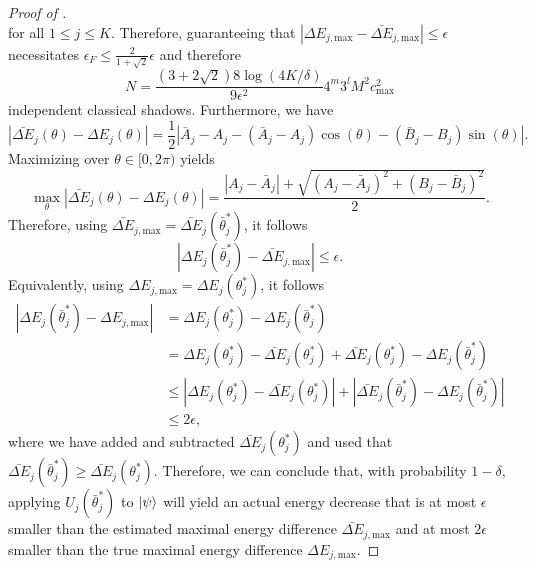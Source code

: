 \begin{proof}[Proof of ]
\begin{equation}
    \end{equation}
    for all $1\leq j \leq K$. Therefore, guaranteeing that  $|\Delta E_{j, \mathrm{max}}-\bar{\Delta E}_{j, \mathrm{max}}|\leq\epsilon$ necessitates $\epsilon_F\leq \frac{2}{1+\sqrt{2}}\epsilon$ and therefore
    \begin{equation}
        N=\frac{(3+2\sqrt{2})8\log(4K/\delta)}{9\epsilon^2}4^m3^lM^2c^2_\mathrm{max}
    \end{equation}
    independent classical shadows. 
    Furthermore, we have
    \begin{equation}
        \left|\bar{\Delta E}_j(\theta)-\Delta E_j(\theta)\right|=\frac{1}{2}\left|\bar{A}_j-A_j-\left(\bar{A}_j-A_j\right)\cos(\theta)-\left(\bar{B}_j-B_j \right)\sin(\theta)\right|.
    \end{equation}
    Maximizing over $\theta\in[0,2\pi)$ yields
    \begin{equation}
        \max_{\theta}\left|\bar{\Delta E}_j(\theta)-\Delta E_j(\theta)\right|= \frac{\left|A_j-\bar{A}_j\right|+\sqrt{\left(A_j-\bar{A}_j\right)^2+\left(B_j-\bar{B}_j\right)^2}}{2}.
    \end{equation}
    Therefore, using $\bar{\Delta E}_{j,\mathrm{max}}=\bar{\Delta E}_j(\bar{\theta}^*_j)$, it follows
    \begin{equation}
        \left|\Delta E_j(\bar{\theta}^*_j)-\bar{\Delta E}_{j,\mathrm{max}}\right|\leq \epsilon.
    \end{equation}
    Equivalently, using $\Delta E_{j,\mathrm{max}}={\Delta E}_j({\theta}^*_j)$, it follows
    \begin{align}
        \left|\Delta E_j(\bar{\theta}^*_j)-\Delta E_{j,\mathrm{max}}\right|&=\Delta E_j(\theta^*_j)-\Delta E_j(\bar{\theta}^*_j)\\&=\Delta E_j(\theta^*_j)-\bar{\Delta E}_j({\theta}^*_j)+\bar{\Delta E}_j({\theta}^*_j)-\Delta E_j(\bar{\theta}^*_j)\\&\leq \left|\Delta E_j(\theta^*_j)-\bar{\Delta E}_j({\theta}^*_j)\right|+\left|\bar{\Delta E}_j(\bar{\theta}^*_j)-\Delta E_j(\bar{\theta}^*_j)\right|\\
        &\leq 2\epsilon,
    \end{align}
    where we have added and subtracted $\bar{\Delta E}_j(\theta^*_j)$ and used that $\bar{\Delta E}_j(\bar{\theta}^*_j)\geq\bar{\Delta E}_j({\theta}^*_j)$. Therefore, we can conclude that, with probability $1-\delta$, applying $U_j(\bar{\theta}^*_j)$ to $\ket{\psi}$ will yield an actual energy decrease that is at most $\epsilon$ smaller than the estimated maximal energy difference $\bar{\Delta E}_{j,\mathrm{max}}$ and at most $2\epsilon$ smaller than the true maximal energy difference $\Delta E_{j,\mathrm{max}}$.
\end{proof}
